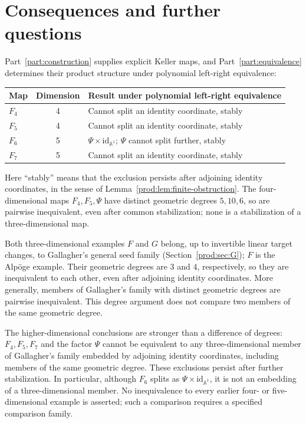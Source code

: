\documentclass[11pt]{article}
\numberwithin{equation}{section}
\theoremstyle{plain}
\theoremstyle{definition}
\theoremstyle{remark}
\newcommand{\A}{\mathbb{A}}
\newcommand{\id}{\mathrm{id}}
\begin{document}
\section{Consequences and further questions}\label{sec:conclusion}
Part~\ref{part:construction} supplies explicit Keller maps, and
Part~\ref{part:equivalence} determines their product structure under
polynomial left-right equivalence:
\begin{center}
\begin{tabular}{@{}lcl@{}}\toprule
Map & Dimension & Result under polynomial left-right equivalence\\\midrule
$F_4$ & 4 & Cannot split an identity coordinate, stably\\
$F_5$ & 4 & Cannot split an identity coordinate, stably\\
$F_6$ & 5 & $\Psi\times\id_{\A^1}$; $\Psi$ cannot split further, stably\\
$F_7$ & 5 & Cannot split an identity coordinate, stably\\\bottomrule
\end{tabular}
\end{center}
Here ``stably'' means that the exclusion persists after adjoining identity
coordinates, in the sense of Lemma~\ref{prod:lem:finite-obstruction}.
The four-dimensional maps $F_4,F_5,\Psi$ have distinct geometric degrees
$5,10,6$, so are pairwise inequivalent, even after common stabilization;
none is a stabilization of a three-dimensional map.

Both three-dimensional examples $F$ and $G$ belong, up to invertible
linear target changes, to Gallagher's general seed family
(Section~\ref{prod:sec:G}); $F$ is the Alp\"oge example.
Their geometric degrees are $3$ and $4$, respectively, so they are
inequivalent to each other, even after adjoining identity coordinates.
More generally, members of Gallagher's family with distinct geometric
degrees are pairwise inequivalent. This degree argument does not compare
two members of the same geometric degree.

The higher-dimensional conclusions are stronger than a difference of
degrees: $F_4,F_5,F_7$ and the factor $\Psi$ cannot be equivalent to
any three-dimensional member of Gallagher's family embedded by adjoining
identity coordinates, including members of the same geometric degree.
These exclusions persist after further stabilization. In particular,
although $F_6$ splits as $\Psi\times\id_{\A^1}$, it is not an
embedding of a three-dimensional member. No inequivalence to every earlier
four- or five-dimensional example is asserted; such a comparison requires
a specified comparison family.
\end{document}
